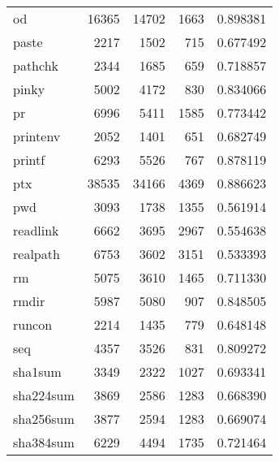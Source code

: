 \begin{longtable}{lrrrr}
od        &                    16365 &        14702 &          1663 &                 0.898381 \\
paste     &                     2217 &         1502 &           715 &                 0.677492 \\
pathchk   &                     2344 &         1685 &           659 &                 0.718857 \\
pinky     &                     5002 &         4172 &           830 &                 0.834066 \\
pr        &                     6996 &         5411 &          1585 &                 0.773442 \\
printenv  &                     2052 &         1401 &           651 &                 0.682749 \\
printf    &                     6293 &         5526 &           767 &                 0.878119 \\
ptx       &                    38535 &        34166 &          4369 &                 0.886623 \\
pwd       &                     3093 &         1738 &          1355 &                 0.561914 \\
readlink  &                     6662 &         3695 &          2967 &                 0.554638 \\
realpath  &                     6753 &         3602 &          3151 &                 0.533393 \\
rm        &                     5075 &         3610 &          1465 &                 0.711330 \\
rmdir     &                     5987 &         5080 &           907 &                 0.848505 \\
runcon    &                     2214 &         1435 &           779 &                 0.648148 \\
seq       &                     4357 &         3526 &           831 &                 0.809272 \\
sha1sum   &                     3349 &         2322 &          1027 &                 0.693341 \\
sha224sum &                     3869 &         2586 &          1283 &                 0.668390 \\
sha256sum &                     3877 &         2594 &          1283 &                 0.669074 \\
sha384sum &                     6229 &         4494 &          1735 &                 0.721464 \\

\end{longtable}
